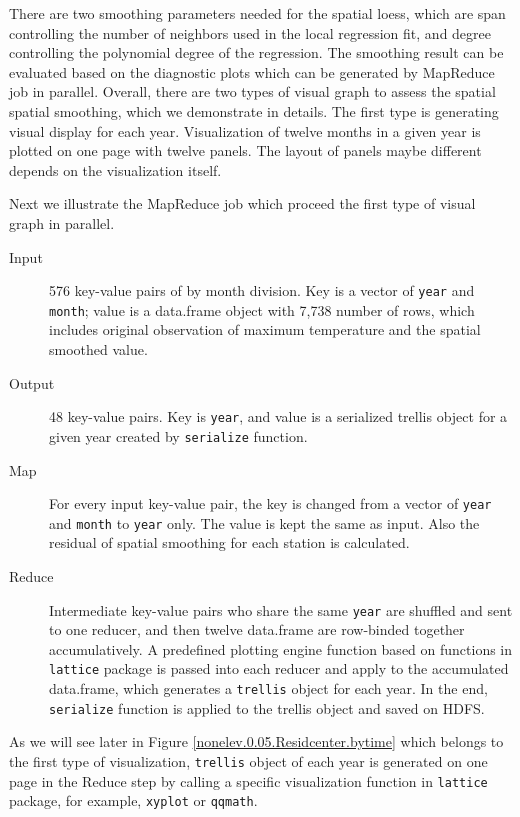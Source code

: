 There are two smoothing parameters needed for the spatial loess, which are span 
controlling the number of neighbors used in the local regression fit, and degree 
controlling the polynomial degree of the regression. The smoothing result can be
evaluated based on the diagnostic plots which can be generated by MapReduce job
in parallel. Overall, there are two types of visual graph to assess the spatial 
spatial smoothing, which we demonstrate in details. The first type is generating 
visual display for each year. Visualization of twelve months in a given year is 
plotted on one page with twelve panels. The layout of panels maybe different 
depends on the visualization itself. 

Next we illustrate the MapReduce job which proceed the first type of visual graph
in parallel.

\begin{description}
  \item[Input] 576 key-value pairs of by month division. Key is a vector of
  \texttt{year} and \texttt{month}; value is a data.frame object with 7,738 
  number of rows, which includes original observation of maximum temperature
  and the spatial smoothed value. 
  \item[Output] 48 key-value pairs. Key is \texttt{year}, and value is a serialized
  trellis object for a given year created by \texttt{serialize} function.
  \item[Map]For every input key-value pair, the key is changed from a vector of 
  \texttt{year} and \texttt{month} to \texttt{year} only. The value is kept the
  same as input. Also the residual of spatial smoothing for each station is 
  calculated.
  \item[Reduce] Intermediate key-value pairs who share the same \texttt{year} are
  shuffled and sent to one reducer, and then twelve data.frame are row-binded 
  together accumulatively. A predefined plotting engine function based on 
  functions in \texttt{lattice} package is passed into each reducer and apply to 
  the accumulated data.frame, which generates a \texttt{trellis} object for each 
  year. In the end, \texttt{serialize} function is applied to the trellis object 
  and saved on HDFS.
\end{description}

As we will see later in Figure 
\href{../plots/a1950/spaimpute/nonelev/span0.05/a1950.spaResidcenter.bytime.pdf}
{\ref*{nonelev.0.05.Residcenter.bytime}} which belongs to the first type of 
visualization, \texttt{trellis} object of each year is generated on one page in 
the Reduce step by calling a specific visualization function in \texttt{lattice} 
package, for example, \texttt{xyplot} or \texttt{qqmath}.

